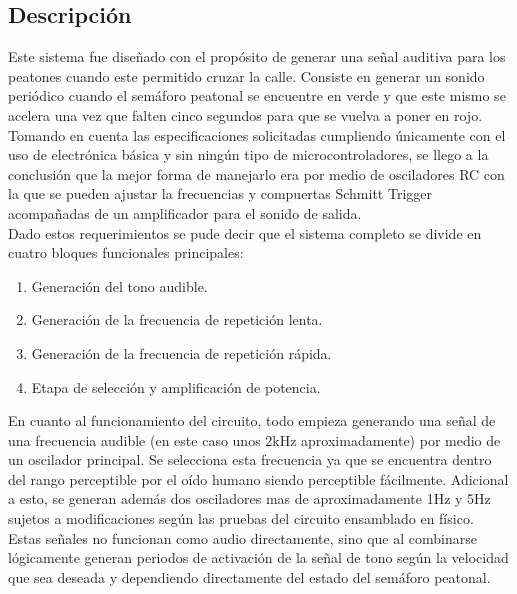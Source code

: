 \documentclass[12pt, journal, onecolumn]{IEEEtran}
\begin{document}
\subsection{Descripción}
Este sistema fue diseñado con el propósito de generar una señal auditiva para los peatones cuando este permitido cruzar la calle. Consiste en generar un sonido periódico cuando el semáforo peatonal se encuentre en verde y que este mismo se acelera una vez que falten cinco segundos para que se vuelva a poner en rojo. \\

Tomando en cuenta las especificaciones solicitadas cumpliendo únicamente con el uso de electrónica básica y sin ningún tipo de microcontroladores, se llego a la conclusión que la mejor forma de manejarlo era por medio de osciladores RC con la que se pueden ajustar la frecuencias y compuertas Schmitt Trigger acompañadas de un amplificador para el sonido de salida.\\

Dado estos requerimientos se pude decir que el sistema completo se divide en cuatro bloques funcionales principales:
\begin{enumerate}
    \item Generación del tono audible.
    \item Generación de la frecuencia de repetición lenta.
    \item Generación de la frecuencia de repetición rápida.
    \item Etapa de selección y amplificación de potencia.
\end{enumerate}

En cuanto al funcionamiento del circuito, todo empieza generando una señal de una frecuencia audible (en este caso unos 2kHz aproximadamente) por medio de un oscilador principal. Se selecciona esta frecuencia ya que se encuentra dentro del rango perceptible por el oído humano siendo perceptible fácilmente.
Adicional a esto, se generan además dos osciladores mas de aproximadamente 1Hz y 5Hz sujetos a modificaciones según las pruebas del circuito ensamblado en físico.\\

Estas señales no funcionan como audio directamente, sino que al combinarse lógicamente generan periodos de activación de la señal de tono según la velocidad que sea deseada y dependiendo directamente del estado del semáforo peatonal.\\
\end{document}
